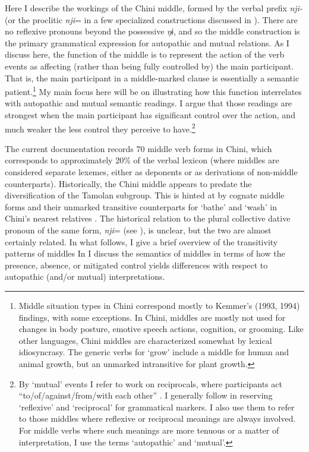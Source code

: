\documentclass[output=paper]{langscibook}
\begin{document}
Here I describe the workings of the Chini middle, formed by the verbal prefix \textit{nji-} (or the proclitic \textit{nji}= in a few specialized constructions discussed in ). There are no reflexive pronouns beyond the possessive \textit{ŋɨ}, and so the middle construction is the primary grammatical expression for autopathic and mutual relations. As I discuss here, the function of the middle is to represent the action of the verb events as affecting (rather than being fully controlled by) the main participant. That is, the main participant in a middle-marked clause is essentially a semantic patient.\footnote{Middle situation types in Chini correspond mostly to Kemmer’s (1993, 1994) findings, with some exceptions. In Chini, middles are mostly not used for changes in body posture, emotive speech actions, cognition, or grooming. Like other languages, Chini middles are characterized somewhat by lexical idiosyncrasy. The generic verbs for ‘grow’ include a middle for human and animal growth, but an unmarked intransitive for plant growth.} My main focus here will be on illustrating how this function interrelates with autopathic and mutual semantic readings. I argue that those readings are strongest when the main participant has significant control over the action, and much weaker the less control they perceive to have.\footnote{By ‘mutual’ events I refer to  work on reciprocals, where participants act “to/of/against/from/with each other” . I generally follow \citet{Haspelmath2020} in reserving ‘reflexive’ and ‘reciprocal’ for grammatical markers. I also use them to refer to those middles where reflexive or reciprocal meanings are always involved. For middle verbs where such meanings are more tenuous or a matter of interpretation, I use the terms ‘autopathic’ and ‘mutual’.}

 The current documentation records 70 middle verb forms in Chini, which corresponds to approximately 20\% of the verbal lexicon (where middles are considered separate lexemes, either as deponents or as derivations of non-middle counterparts). Historically, the Chini middle appears to predate the diversification of the Tamolan subgroup. This is hinted at by cognate middle forms and their unmarked transitive counterparts for ‘bathe’ and ‘wash’ in Chini’s nearest relatives \citep{Zgraggen1974}. The historical relation to the plural collective dative pronoun of the same form, \textit{nji}= (see ), is unclear, but the two are almost certainly related. In what follows, I give a brief overview of the transitivity patterns of middles  In  I discuss the semantics of middles in terms of how the presence, absence, or mitigated control yields differences with respect to autopathic (and/or mutual) interpretations.
\end{document}
